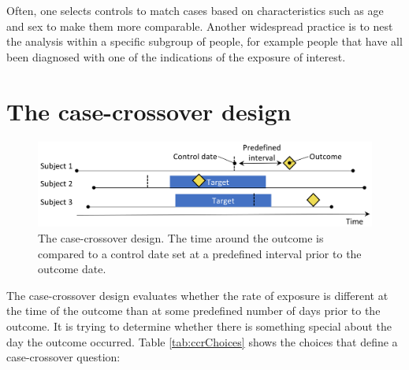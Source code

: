 \documentclass[11pt]{book}
\begin{document}
Often, one selects controls to match cases based on characteristics such
as age and sex to make them more comparable. Another widespread practice
is to nest the analysis within a specific subgroup of people, for
example people that have all been diagnosed with one of the indications
of the exposure of interest.

\section{The case-crossover design}\label{the-case-crossover-design}

\begin{figure}

{\centering \includegraphics[width=0.9\linewidth]{images/PopulationLevelEstimation/caseCrossover} 

}

\caption{The case-crossover design. The time around the outcome is compared to a control date set at a predefined interval prior to the outcome date.}\label{fig:caseCrossover}
\end{figure}

The case-crossover \citep{maclure_1991} design evaluates whether the
rate of exposure is different at the time of the outcome than at some
predefined number of days prior to the outcome. It is trying to
determine whether there is something special about the day the outcome
occurred. Table \ref{tab:ccrChoices} shows the choices that define a
case-crossover question:
\end{document}
